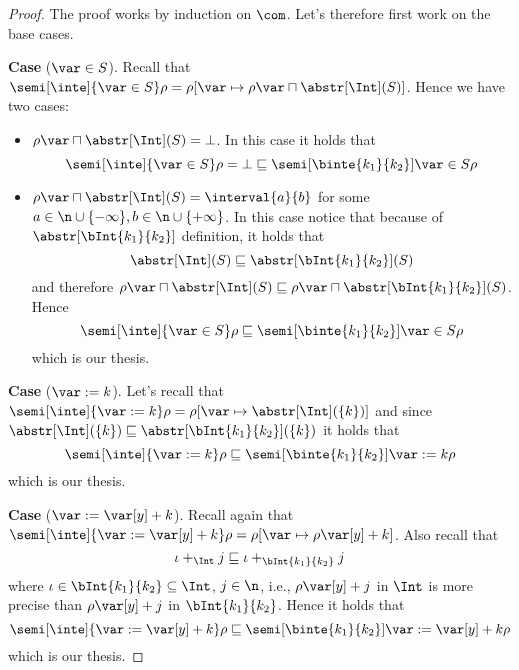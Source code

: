\begin{proof}
  The proof works by induction on \(\com\). Let's therefore first work
  on the base cases.

  \medskip

  \noindent
  \textbf{Case} (\(\var \in S\)).
  Recall that
  \(\semi[\inte]{\var\in S}\rho = \rho[\var \mapsto {\rho\var \sqcap
    \abstr[\Int](S)}]\). Hence we have two cases:
  \begin{itemize}
  \item \({\rho\var \sqcap \abstr[\Int](S)} = \bot\). In this case it
    holds that
    \begin{equation*}
      \semi[\inte]{\var\in S}\rho = \bot \sqsubseteq \semi[\binte{k_1}{k_2}]{\var\in S}\rho
    \end{equation*}
    
  \item \({\rho\var \sqcap \abstr[\Int](S)} = \interval{a}{b}\) for
    some \({a \in \n \cup \{-\infty\}}, {b \in
      \n\cup\{+\infty\}}\). In this case notice that because of
    \(\abstr[\bInt{k_1}{k_2}]\) definition, it holds that
    \begin{equation*}
      \abstr[\Int](S) \sqsubseteq \abstr[\bInt{k_1}{k_2}](S)
    \end{equation*}
    and therefore
    \({\rho\var \sqcap \abstr[\Int](S)} \sqsubseteq {\rho\var \sqcap
      \abstr[\bInt{k_1}{k_2}](S)}\). Hence
    \begin{equation*}
      {\semi[\inte]{\var\in S}\rho} \sqsubseteq {\semi[\binte{k_1}{k_2}]{\var\in S}\rho}
    \end{equation*}
    which is our thesis.
  \end{itemize}

  \medskip

  \noindent
  \textbf{Case} (\(\var := k\)).
  Let's recall that
  \({\semi[\inte]{\var := k}\rho = \rho[\var \mapsto
    \abstr[\Int](\{k\})]}\) and since
  \({\abstr[\Int](\{k\})} \sqsubseteq {\abstr[\bInt{k_1}{k_2}](\{k\})}\) it holds
  that
  \begin{equation*}
    \semi[\inte]{\var := k}\rho \sqsubseteq \semi[\binte{k_1}{k_2}]{\var := k}\rho
  \end{equation*}
  which is our thesis.

  \medskip

  \noindent
  \textbf{Case} (\(\var := \var[y] + k\)).
  Recall again that
  \({\semi[\inte]{\var := \var[y] + k}\rho} = {\rho[\var \mapsto
    \rho\var[y] + k]}\). Also recall that
  \begin{equation*}
    \iota +_{\Int} j \sqsubseteq \iota +_{\bInt{k_1}{k_2}} j
  \end{equation*}
  where \(\iota \in \bInt{k_1}{k_2} \subseteq \Int\), \(j\in\n\),
  i.e., \(\rho\var[y] + j\) in \(\Int\) is more precise than
  \(\rho\var[y] + j\) in \(\bInt{k_1}{k_2}\). Hence it holds that
  \begin{equation*}
    {\semi[\inte]{\var := \var[y] + k}\rho} \sqsubseteq {\semi[\binte{k_1}{k_2}]{\var := \var[y] + k}\rho}
  \end{equation*}
  which is our thesis.


\end{proof}
